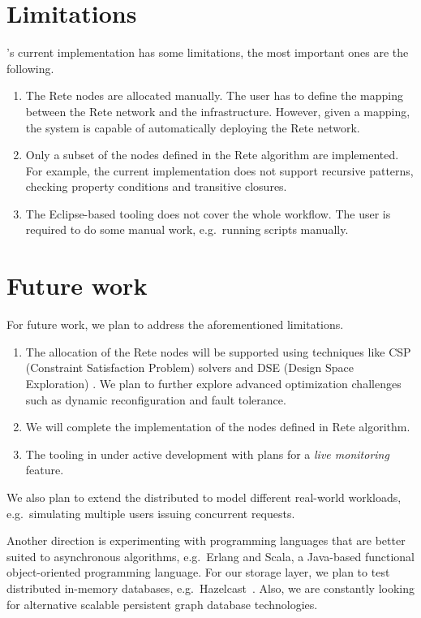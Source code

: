 \section{Limitations}

\iqd{}'s current implementation has some limitations, the most important ones are the following.

\begin{enumerate}
  \item The Rete nodes are allocated manually. The user has to define the mapping between the Rete network and the infrastructure. However, given a mapping, the system is capable of automatically deploying the Rete network.
  \item Only a subset of the nodes defined in the Rete algorithm are implemented. For example, the current implementation does not support recursive patterns, checking property conditions and transitive closures.
  \item The Eclipse-based tooling does not cover the whole workflow. The user is required to do some manual work, e.g.\ running scripts manually.
\end{enumerate}

\section{Future work}
\label{future-work}

For future work, we plan to address the aforementioned limitations.

\begin{enumerate}
  \item The allocation of the Rete nodes will be supported using techniques like CSP (Constraint Satisfaction Problem) solvers and DSE (Design Space Exploration) \cite{DSE11}. We plan to further explore advanced optimization challenges such as dynamic reconfiguration and fault tolerance.
  \item We will complete the implementation of the nodes defined in Rete algorithm.
  \item The tooling in under active development with plans for a \emph{live monitoring} feature.
\end{enumerate}

We also plan to extend the distributed \tb{} to model different real-world workloads, e.g.\ simulating multiple users issuing concurrent requests.

Another direction is experimenting with programming languages that are better suited to asynchronous algorithms, e.g.\ Erlang and Scala, a Java-based functional object-oriented programming language. 
For our storage layer, we plan to test distributed in-memory databases, e.g.\ Hazelcast~\cite{Hazelcast}. Also, we are constantly looking for alternative scalable persistent graph database technologies. 
